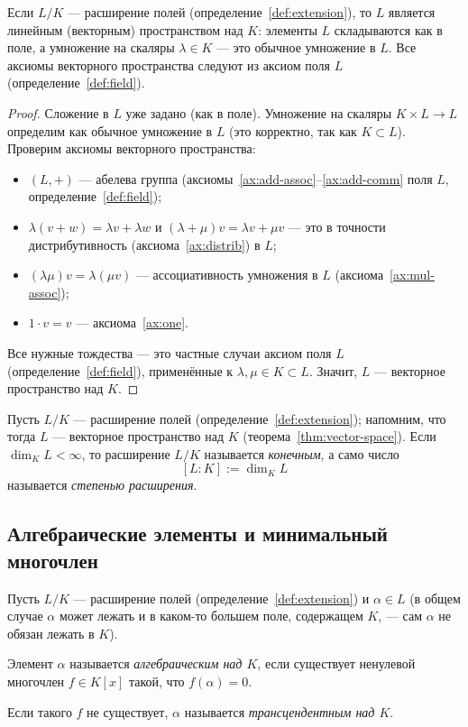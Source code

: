 \documentclass[12pt]{article}
\begin{document}
    \begin{theorem}\label{thm:vector-space}
    	Если $L/K$ --- расширение полей (определение~\ref{def:extension}), то $L$ является линейным (векторным) пространством над $K$: элементы $L$ складываются как в поле, а умножение на скаляры $\lambda \in K$ --- это обычное умножение в $L$. Все аксиомы векторного пространства следуют из аксиом поля $L$ (определение~\ref{def:field}).
    \end{theorem}
    \begin{proof}
    	Сложение в $L$ уже задано (как в поле). Умножение на скаляры $K \times L \to L$ определим как обычное умножение в $L$ (это корректно, так как $K \subset L$). Проверим аксиомы векторного пространства:
    	\begin{itemize}
    		\item $(L, +)$ --- абелева группа (аксиомы~\ref{ax:add-assoc}--\ref{ax:add-comm} поля $L$, определение~\ref{def:field});
    		\item $\lambda(v+w) = \lambda v + \lambda w$ и $(\lambda+\mu)v = \lambda v + \mu v$ --- это в точности дистрибутивность (аксиома~\ref{ax:distrib}) в $L$;
    		\item $(\lambda\mu)v = \lambda(\mu v)$ --- ассоциативность умножения в $L$ (аксиома~\ref{ax:mul-assoc});
    		\item $1 \cdot v = v$ --- аксиома~\ref{ax:one}.
    	\end{itemize}
    	Все нужные тождества --- это частные случаи аксиом поля $L$ (определение~\ref{def:field}), применённые к $\lambda, \mu \in K \subset L$. Значит, $L$ --- векторное пространство над $K$.
    \end{proof}
    
    \begin{definition}\label{def:degree}
    	Пусть $L/K$ --- расширение полей (определение~\ref{def:extension}); напомним, что тогда $L$ --- векторное пространство над $K$ (теорема~\ref{thm:vector-space}). Если $\dim_K L < \infty$, то расширение $L/K$ называется \emph{конечным}, а само число
    	\[
    	[L:K] := \dim_K L
    	\]
    	называется \emph{степенью расширения}.
    \end{definition}
    
    \subsection{Алгебраические элементы и минимальный многочлен}
    
    \begin{definition}\label{def:algebraic}
    	Пусть $L/K$ --- расширение полей (определение~\ref{def:extension}) и $\alpha \in L$ (в общем случае $\alpha$ может лежать и в каком-то большем поле, содержащем $K$, --- сам $\alpha$ не обязан лежать в $K$).
    
    	Элемент $\alpha$ называется \emph{алгебраическим над $K$}, если существует ненулевой многочлен $f \in K[x]$ такой, что $f(\alpha) = 0$.
    
    	Если такого $f$ не существует, $\alpha$ называется \emph{трансцендентным над $K$}.
    \end{definition}
    
\end{document}
